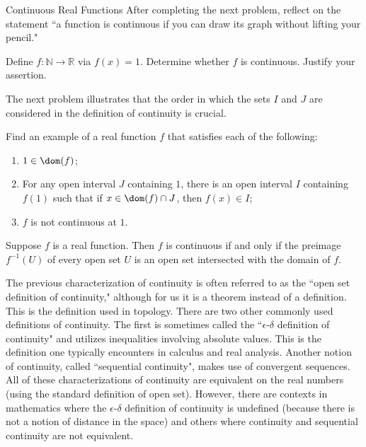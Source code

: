 \begin{section}{Continuous Real Functions}
After completing the next problem, reflect on the statement ``a function is continuous if you can draw its graph without lifting your pencil."

\begin{problem}
Define $f:\mathbb{N}\to\mathbb{R}$ via $f(x)=1$. Determine whether $f$ is continuous. Justify your assertion.
\end{problem}

The next problem illustrates that the order in which the sets $I$ and $J$ are considered in the definition of continuity is crucial.

\begin{problem}
Find an example of a real function $f$ that satisfies each of the following:
\begin{enumerate}[label=\textrm{(\roman*)}]
\item $1\in\dom(f)$;
\item For any open interval $J$ containing $1$, there is an open interval $I$ containing $f(1)$ such that if $x\in \dom(f)\cap J$, then $f(x)\in I$;
\item $f$ is not continuous at $1$.
\end{enumerate}
\end{problem}

\begin{theorem}\label{thm:inverse images open sets}
Suppose $f$ is a real function. Then $f$ is continuous if and only if the preimage $f^{-1}(U)$ of every open set $U$ is an open set intersected with the domain of $f$.
\end{theorem}

The previous characterization of continuity is often referred to as the ``open set definition of continuity," although for us it is a theorem instead of a definition. This is the definition used in topology. There are two other commonly used definitions of continuity. The first is sometimes called the ``$\epsilon$-$\delta$ definition of continuity" and utilizes inequalities involving absolute values. This is the definition one typically encounters in calculus and real analysis. Another notion of continuity, called ``sequential continuity", makes use of convergent sequences.  All of these characterizations of continuity are equivalent on the real numbers (using the standard definition of open set). However, there are contexts in mathematics where the $\epsilon$-$\delta$ definition of continuity is undefined (because there is not a notion of distance in the space) and others where continuity and sequential continuity are not equivalent.


\end{section}

